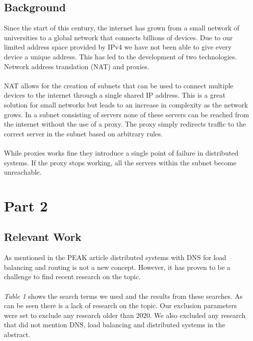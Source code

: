 \documentclass[12pt]{article}
\begin{document}
\subsection{Background}
Since the start of this century, the internet has grown from a small network of universities to a global network that connects billions of devices. Due to our limited
address space provided by IPv4 \cite{InternetProtocol1981} we have not been able to give every device a unique address. This has led to the development of two technologies. Network address translation (NAT) \cite{holdregeIPNetworkAddress1999} and proxies.
\\
\\
NAT allows for the creation of subnets that can be used to connect multiple devices to the internet through a single shared IP address. This is a great solution for small networks
but leads to an increase in complexity as the network grows. In a subnet consisting of servers none of these servers can be reached from the internet without the use of a proxy.
The proxy simply redirects traffic to the correct server in the subnet based on arbitrary rules.
\\
\\
While proxies works fine they introduce a single point of failure in distributed systems. If the proxy stops working, all the servers within the subnet become unreachable.

\section{Part 2}
\subsection{Relevant Work}
As mentioned in the PEAK article \cite{heimonenPreprintPEAKProxy2024} distributed systems with DNS for load balancing and routing is not a new concept.
However, it has proven to be a challenge to find recent research on the topic.
\\
\\
\textit{Table 1} shows the search terms we used and the results from these searches. As can be seen
there is a lack of research on the topic. Our exclusion parameters were set to exclude any research older than 2020.
We also excluded any research that did not mention DNS, load balancing and distributed systems in the abstract.
\end{document}
